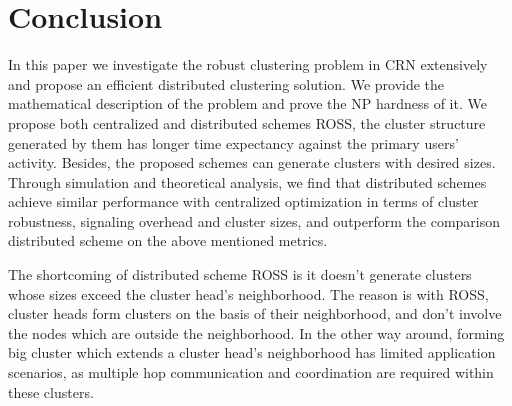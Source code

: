 \documentclass[10pt,journal,compsoc]{IEEEtran}
\theoremstyle{mytheoremstyle}
\theoremstyle{mytheoremstyle}
\theoremstyle{mytheoremstyle}
\begin{document}
\section{Conclusion}
\label{conclusion}
In this paper we investigate the robust clustering problem in CRN extensively and propose an efficient distributed clustering solution.
We provide the mathematical description of the problem and prove the NP hardness of it.
We propose both centralized and distributed schemes ROSS, the cluster structure generated by them has longer time expectancy against the primary users' activity.
Besides, the proposed schemes can generate clusters with desired sizes.
Through simulation and theoretical analysis, we find that distributed schemes achieve similar performance with centralized optimization in terms of cluster robustness, signaling overhead and cluster sizes, and outperform the comparison distributed scheme on the above mentioned metrics.

The shortcoming of distributed scheme ROSS is it doesn't generate clusters whose sizes exceed the cluster head's neighborhood.
The reason is with ROSS, cluster heads form clusters on the basis of their neighborhood, and don't involve the nodes which are outside the neighborhood.
In the other way around, forming big cluster which extends a cluster head's neighborhood has limited application scenarios, as multiple hop communication and coordination are required within these clusters.









%
\end{document}
